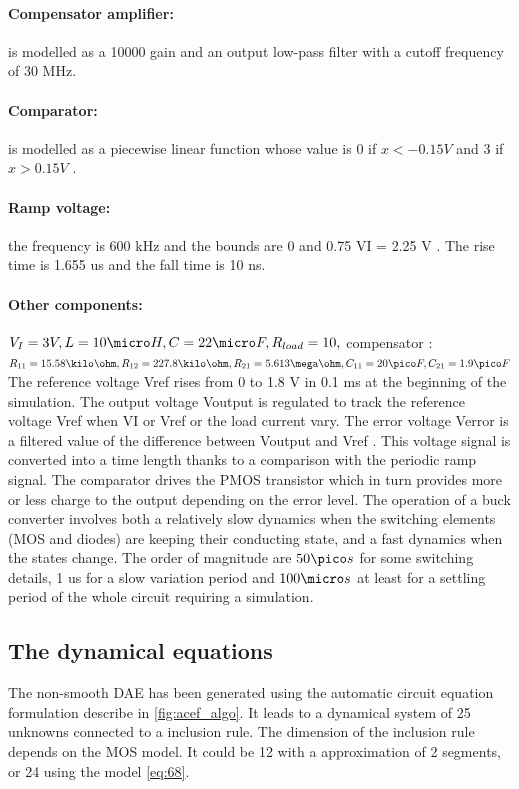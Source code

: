 \documentclass{article}
\begin{document}
\paragraph{Compensator amplifier:} is modelled as a 10000 gain and an output low-pass
filter with a cutoff frequency of 30 MHz.
\paragraph{Comparator:} is modelled as a piecewise linear function whose value is 0 if
$x < -0.15V$ and 3 if $x > 0.15V$ .
\paragraph{Ramp voltage:} the frequency is 600 kHz and the bounds are 0 and 0.75 VI = 2.25 V .
The rise time is 1.655 us and the fall time is 10 ns.
\paragraph{Other components:} $V_I = 3 V , L = 10 \micro H, C = 22 \micro F,R_{load} = 10,$ compensator
: $R_{11} = 15.58 \kilo \ohm , R_{12} = 227.8 \kilo \ohm ,R_{21} = 5.613 \mega \ohm, C_{11} = 20 \pico F, C_{21} =
1.9 \pico F$
The reference voltage Vref rises from 0 to 1.8 V in 0.1 ms at the beginning
of the simulation.
The output voltage Voutput is regulated to track the reference voltage Vref when
VI or Vref or the load current vary. The error voltage Verror is a filtered value
of the difference between Voutput and Vref . This voltage signal is converted
into a time length thanks to a comparison with the periodic ramp signal. The
comparator drives the PMOS transistor which in turn provides more or less
charge to the output depending on the error level. The operation of a buck
converter involves both a relatively slow dynamics when the switching elements
(MOS and diodes) are keeping their conducting state, and a fast dynamics when
the states change. The order of magnitude are $ 50 \pico s$ for some switching details,
1 us for a slow variation period and $100 \micro s$ at least for a settling period of the
whole circuit requiring a simulation.
\subsection{The dynamical equations}
\label{section41}
The non-smooth DAE has been generated using the automatic circuit equation formulation describe in
\ref{fig:acef_algo}. It leads to a dynamical system of 25 unknowns connected to a inclusion rule. The dimension of the inclusion
rule depends on the MOS model. It could be 12 with a approximation of 2 segments, or 24 using the
model \ref{eq:68}.  
\end{document}
